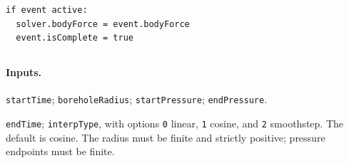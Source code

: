 \begin{lstlisting}[caption={BodyForceUpdate event pseudocode.}]
if event active:
  solver.bodyForce = event.bodyForce
  event.isComplete = true
\end{lstlisting}

\subsection{}
\label{subsec:event-borehole-pressure}

\paragraph{Inputs.}
\begin{description}[leftmargin=*,style=nextline]
\item[\textbf{Required.}] \texttt{startTime}; \texttt{boreholeRadius}; \texttt{startPressure}; \texttt{endPressure}.
\item[\textbf{Optional.}] \texttt{endTime}; \texttt{interpType}, with options \texttt{0} linear, \texttt{1} cosine, and \texttt{2} smoothstep.  The default is cosine. The radius must be finite and strictly positive; pressure endpoints must be finite.
\end{description}

